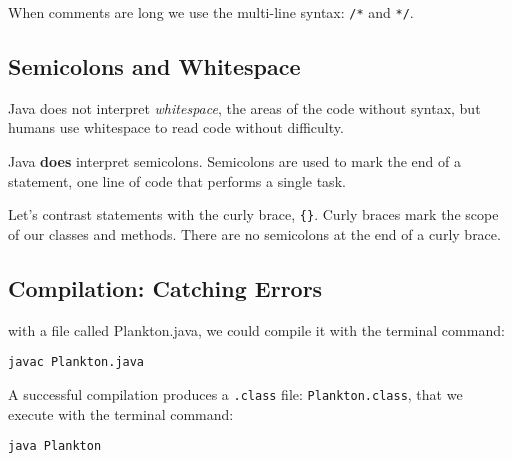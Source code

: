 \documentclass[a4paper, 12pt]{article}
\begin{document}
When comments are long we use the multi-line syntax: \verb|/*| and \verb|*/|.

\subsection{Semicolons and Whitespace}
Java does not interpret \textit{whitespace}, the areas of the code without syntax, but humans use whitespace to read code without difficulty.

Java \textbf{does} interpret semicolons. Semicolons are used to mark the end of a statement, one line of code that performs a single task.

Let's contrast statements with the curly brace, \verb|{}|. Curly braces mark the scope of our classes and methods. There are no semicolons at the end of a curly brace.

\subsection{Compilation: Catching Errors}
with a file called Plankton.java, we could compile it with the terminal command:

\verb|javac Plankton.java|

A successful compilation produces a \verb|.class| file: \verb|Plankton.class|, that we execute with the terminal command:

\verb|java Plankton|
\end{document}
